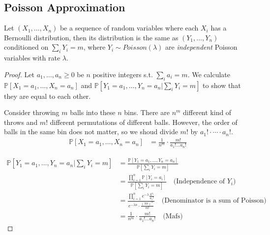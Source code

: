     \subsection{Poisson Approximation}
        \begin{theorem}\label{thm:PoissonApproximation}
            Let $(X_1,\dots,X_n)$ be a sequence of random variables where each $X_i$ has a Bernoulli distribution, then its distribution is the same as $(Y_1, \dots, Y_n)$ conditioned on $\sum_i Y_i = m$, where $Y_i \sim Poisson(\lambda)$ are \emph{independent} Poisson variables with rate $\lambda$.
        \end{theorem}
        \begin{proof}
            Let $a_1, \dots, a_n \ge 0$ be $n$ positive integers s.t. $\sum_i a_i = m$. We calculate $\mathbb{P}[X_1 = a_1, \dots, X_n = a_n]$ and $\mathbb{P}[Y_1 = a_1, \dots, Y_n = a_n|\sum_i Y_i=m]$ to show that they are equal to each other.

            Consider throwing $m$ balls into these $n$ bins. There are $n^m$ different kind of throws and $m!$ different permutations of different balls. However, the order of balls in the same bin does not matter, so we shoud divide $m!$ by $a_1!\cdot \cdots \cdot a_n!$.
            \begin{align*}
                \mathbb{P}[X_1 = a_1, \dots, X_n = a_n]
                &= \frac{1}{n^m} \cdot \frac{m!}{a_1! \dots a_n!}
            \end{align*}

            \begin{align*}
                \mathbb{P}[Y_1 = a_1, \dots, Y_n = a_n | \sum_iY_i = m]
                &= \frac{\mathbb{P}[Y_1=a_1,\dots,Y_n=a_n]}{\mathbb{P}[\sum_i Y_i = m]}\\
                &= \frac{\prod_{i=1}^n \mathbb{P}[Y_i = a_i]}{\mathbb{P}[\sum_i Y_i = m]} \quad \text{(Independence of $Y_i$)}\\
                &= \frac{\prod_{i=1}^n e^{-\lambda}\frac{\lambda^{a_i}}{a_i!}}{e^{-\lambda n} \cdot \frac{(\lambda n)^m}{m!}} \quad \text{(Denominator is a sum of Poisson)}\\
                &= \frac{1}{n^m} \cdot \frac{m!}{a_1! \dots a_n!} \quad \text{(Mafs)}
            \end{align*}

        \end{proof}

